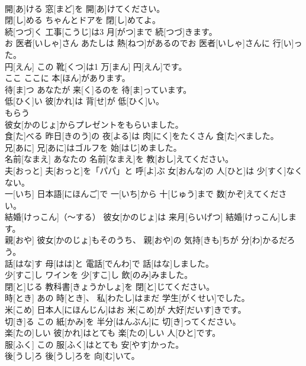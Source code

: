 \documentclass[8pt]{extreport}
\begin{document}
\begin{CJK}{UTF8}{min}
\\	開[あ]ける	窓[まど]を 開[あ]けてください。		
\\	閉[し]める	ちゃんとドアを 閉[し]めてよ。		
\\	続[つづ]く	工事[こうじ]は3 月[がつ]まで 続[つづ]きます。		
\\	お 医者[いしゃ]さん	あたしは 熱[ねつ]があるのでお 医者[いしゃ]さんに 行[い]った。		
\\	円[えん]	この 靴[くつ]は1 万[まん] 円[えん]です。		
\\	ここ	ここに 本[ほん]があります。		
\\	待[ま]つ	あなたが 来[く]るのを 待[ま]っています。		
\\	低[ひく]い	彼[かれ]は 背[せ]が 低[ひく]い。		
\\	もらう
\\	彼女[かのじょ]からプレゼントをもらいました。		
\\	食[た]べる	昨日[きのう]の 夜[よる]は 肉[にく]をたくさん 食[た]べました。		
\\	兄[あに]	兄[あに]はゴルフを 始[はじ]めました。		
\\	名前[なまえ]	あなたの 名前[なまえ]を 教[おし]えてください。		
\\	夫[おっと]	夫[おっと]を「パパ」と 呼[よ]ぶ 女[おんな]の 人[ひと]は 少[すく]なくない。		
\\	一[いち]	日本語[にほんご]で 一[いち]から 十[じゅう]まで 数[かぞ]えてください。		
\\	結婚[けっこん]（～する）	彼女[かのじょ]は 来月[らいげつ] 結婚[けっこん]します。		
\\	親[おや]	彼女[かのじょ]もそのうち、 親[おや]の 気持[きも]ちが 分[わ]かるだろう。		
\\	話[はな]す	母[はは]と 電話[でんわ]で 話[はな]しました。		
\\	少[すこ]し	ワインを 少[すこ]し 飲[のみ]みました。		
\\	閉[と]じる	教科書[きょうかしょ]を 閉[と]じてください。		
\\	時[とき]	あの 時[とき]、 私[わたし]はまだ 学生[がくせい]でした。		
\\	米[こめ]	日本人[にほんじん]はお 米[こめ]が 大好[だいす]きです。		
\\	切[き]る	この 紙[かみ]を 半分[はんぶん]に 切[き]ってください。		
\\	楽[たの]しい	彼[かれ]はとても 楽[たの]しい 人[ひと]です。		
\\	服[ふく]	この 服[ふく]はとても 安[やす]かった。		
\\	後[うし]ろ	後[うし]ろを 向[む]いて。		

\end{CJK}
\end{document}
